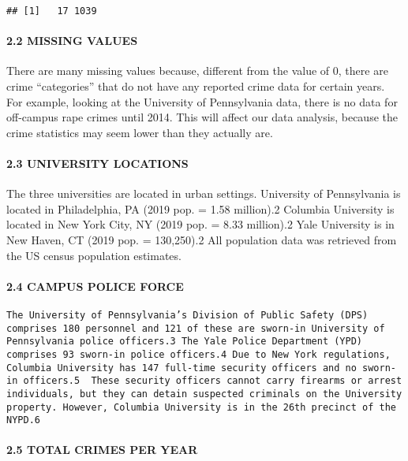 \documentclass[
]{article}
\begin{document}
\begin{verbatim}
## [1]   17 1039
\end{verbatim}

\hypertarget{missing-values}{%
\paragraph{2.2 MISSING VALUES}\label{missing-values}}

There are many missing values because, different from the value of 0,
there are crime ``categories'' that do not have any reported crime data
for certain years. For example, looking at the University of
Pennsylvania data, there is no data for off-campus rape crimes until
2014. This will affect our data analysis, because the crime statistics
may seem lower than they actually are.

\hypertarget{university-locations}{%
\paragraph{2.3 UNIVERSITY LOCATIONS}\label{university-locations}}

The three universities are located in urban settings. University of
Pennsylvania is located in Philadelphia, PA (2019 pop. = 1.58 million).2
Columbia University is located in New York City, NY (2019 pop. = 8.33
million).2 Yale University is in New Haven, CT (2019 pop. = 130,250).2
All population data was retrieved from the US census population
estimates.

\hypertarget{campus-police-force}{%
\paragraph{2.4 CAMPUS POLICE FORCE}\label{campus-police-force}}

\begin{verbatim}
The University of Pennsylvania’s Division of Public Safety (DPS) comprises 180 personnel and 121 of these are sworn-in University of Pennsylvania police officers.3 The Yale Police Department (YPD) comprises 93 sworn-in police officers.4 Due to New York regulations, Columbia University has 147 full-time security officers and no sworn-in officers.5  These security officers cannot carry firearms or arrest individuals, but they can detain suspected criminals on the University property. However, Columbia University is in the 26th precinct of the NYPD.6 
\end{verbatim}

\hypertarget{total-crimes-per-year}{%
\paragraph{2.5 TOTAL CRIMES PER YEAR}\label{total-crimes-per-year}}
\end{document}
